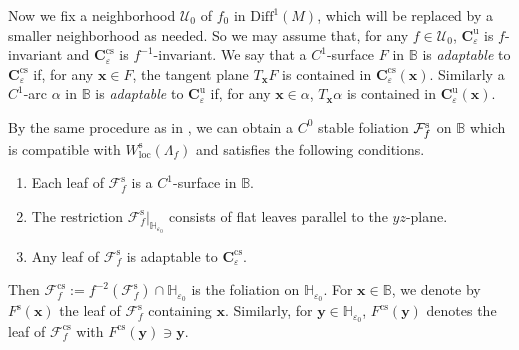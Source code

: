 \documentclass{amsart}
\theoremstyle{plain}
\theoremstyle{definition}
\numberwithin{equation}{section}
\numberwithin{figure}{section}
\def\bb{\mathbb{B}}
\def\hh{\mathbb{H}}
\def\bx{{\boldsymbol{x}}}
\def\by{{\boldsymbol{y}}}
\def\ve{\varepsilon}
\def\cs{{\mathrm{cs}}}
\def\rs{{\mathrm{s}}}
\def\cf{{\mathcal{F}}}
\begin{document}
Now we fix a neighborhood $\mathcal{U}_0$ of $f_0$ in $\mathrm{Diff}^1(M)$, 
which will be replaced by a smaller neighborhood as needed.
So we may assume that, for any $f\in \mathcal{U}_0$, 
$\boldsymbol{C}_{\varepsilon}^{\mathrm{u}}$ is $f$-invariant and 
$\boldsymbol{C}_{\varepsilon}^{\mathrm{cs}}$ is $f^{-1}$-invariant.
We say that a $C^1$-surface $F$ in $\mathbb{B}$ is \emph{adaptable} to $\boldsymbol{C}_{\varepsilon}^{\mathrm{cs}}$ if, for any $\boldsymbol{x}\in F$, 
the tangent plane $T_{\boldsymbol{x}} F$ is contained in $\boldsymbol{C}_{\varepsilon}^{\mathrm{cs}}(\boldsymbol{x})$.
Similarly a $C^1$-arc $\alpha$ in $\mathbb{B}$ is \emph{adaptable} to $\boldsymbol{C}_{\varepsilon}^{\mathrm{u}}$ if, 
for any $\boldsymbol{x}\in \alpha$, $T_{\boldsymbol{x}}\alpha$ is contained in  $\boldsymbol{C}_{\varepsilon}^{\mathrm{u}}(\boldsymbol{x})$.



By the same procedure as in \cite[Subsection 2.4]{PT93},
we can obtain a  
$C^{0}$ stable foliation $\mathcal{F}^{\rm s}_{f}$ on $\mathbb{B}$ 
which is compatible with $W_{\mathrm{loc}}^{\rs}(\Lambda_{f})$ and satisfies the following conditions.
\begin{enumerate}[({F}1)]
\makeatletter
\renewcommand{\p@enumi}{F}
\makeatother
\item
Each leaf of $\mathcal{F}_f^{\mathrm{s}}$ is a $C^1$-surface in $\mathbb{B}$.\label{F1}
\item
The restriction $\mathcal{F}_f^{\mathrm{s}}|_{\mathbb{H}_{\varepsilon_0}}$ consists of flat leaves parallel to the $yz$-plane.\label{F2}
\item
Any leaf of $\mathcal{F}_f^{\mathrm{s}}$ is adaptable to $\boldsymbol{C}_{\varepsilon}^{\mathrm{cs}}$.\label{F3}
\end{enumerate} 
Then $\mathcal{F}_f^{\cs}:=f^{-2}(\mathcal{F}_f^{\mathrm{s}})\cap \hh_{\ve_0}$ is the 
foliation on $\hh_{\ve_0}$.
For $\bx\in \bb$, we denote by $F^{\rs}(\bx)$ the leaf of $\cf_f^{\rs}$ containing 
$\bx$.
Similarly, for $\by\in \hh_{\ve_0}$, $F^{\cs}(\by)$ denotes the leaf of $\cf_f^{\cs}$ 
with $F^{\cs}(\by)\ni \by$.
\end{document}
